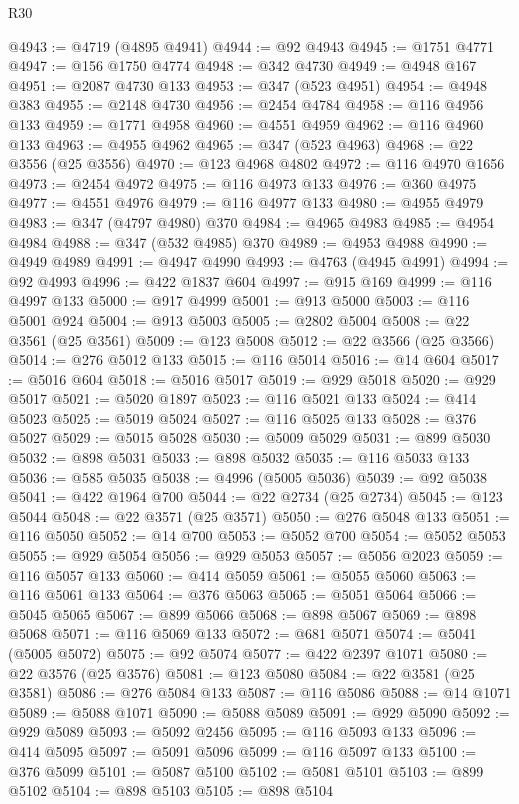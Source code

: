 \begin{lexlean}{R30}
\begin{coremodule}
@4943 := @4719 (@4895 @4941)
@4944 := @92 @4943
@4945 := @1751 @4771
@4947 := @156 @1750 @4774
@4948 := @342 @4730
@4949 := @4948 @167
@4951 := @2087 @4730 @133
@4953 := @347 (@523 @4951)
@4954 := @4948 @383
@4955 := @2148 @4730
@4956 := @2454 @4784
@4958 := @116 @4956 @133
@4959 := @1771 @4958
@4960 := @4551 @4959
@4962 := @116 @4960 @133
@4963 := @4955 @4962
@4965 := @347 (@523 @4963)
@4968 := @22 @3556 (@25 @3556)
@4970 := @123 @4968 @4802
@4972 := @116 @4970 @1656
@4973 := @2454 @4972
@4975 := @116 @4973 @133
@4976 := @360 @4975
@4977 := @4551 @4976
@4979 := @116 @4977 @133
@4980 := @4955 @4979
@4983 := @347 (@4797 @4980) @370
@4984 := @4965 @4983
@4985 := @4954 @4984
@4988 := @347 (@532 @4985) @370
@4989 := @4953 @4988
@4990 := @4949 @4989
@4991 := @4947 @4990
@4993 := @4763 (@4945 @4991)
@4994 := @92 @4993
@4996 := @422 @1837 @604
@4997 := @915 @169
@4999 := @116 @4997 @133
@5000 := @917 @4999
@5001 := @913 @5000
@5003 := @116 @5001 @924
@5004 := @913 @5003
@5005 := @2802 @5004
@5008 := @22 @3561 (@25 @3561)
@5009 := @123 @5008
@5012 := @22 @3566 (@25 @3566)
@5014 := @276 @5012 @133
@5015 := @116 @5014
@5016 := @14 @604
@5017 := @5016 @604
@5018 := @5016 @5017
@5019 := @929 @5018
@5020 := @929 @5017
@5021 := @5020 @1897
@5023 := @116 @5021 @133
@5024 := @414 @5023
@5025 := @5019 @5024
@5027 := @116 @5025 @133
@5028 := @376 @5027
@5029 := @5015 @5028
@5030 := @5009 @5029
@5031 := @899 @5030
@5032 := @898 @5031
@5033 := @898 @5032
@5035 := @116 @5033 @133
@5036 := @585 @5035
@5038 := @4996 (@5005 @5036)
@5039 := @92 @5038
@5041 := @422 @1964 @700
@5044 := @22 @2734 (@25 @2734)
@5045 := @123 @5044
@5048 := @22 @3571 (@25 @3571)
@5050 := @276 @5048 @133
@5051 := @116 @5050
@5052 := @14 @700
@5053 := @5052 @700
@5054 := @5052 @5053
@5055 := @929 @5054
@5056 := @929 @5053
@5057 := @5056 @2023
@5059 := @116 @5057 @133
@5060 := @414 @5059
@5061 := @5055 @5060
@5063 := @116 @5061 @133
@5064 := @376 @5063
@5065 := @5051 @5064
@5066 := @5045 @5065
@5067 := @899 @5066
@5068 := @898 @5067
@5069 := @898 @5068
@5071 := @116 @5069 @133
@5072 := @681 @5071
@5074 := @5041 (@5005 @5072)
@5075 := @92 @5074
@5077 := @422 @2397 @1071
@5080 := @22 @3576 (@25 @3576)
@5081 := @123 @5080
@5084 := @22 @3581 (@25 @3581)
@5086 := @276 @5084 @133
@5087 := @116 @5086
@5088 := @14 @1071
@5089 := @5088 @1071
@5090 := @5088 @5089
@5091 := @929 @5090
@5092 := @929 @5089
@5093 := @5092 @2456
@5095 := @116 @5093 @133
@5096 := @414 @5095
@5097 := @5091 @5096
@5099 := @116 @5097 @133
@5100 := @376 @5099
@5101 := @5087 @5100
@5102 := @5081 @5101
@5103 := @899 @5102
@5104 := @898 @5103
@5105 := @898 @5104

\end{coremodule}
\end{lexlean}
